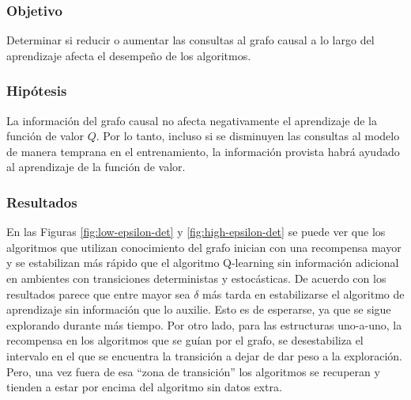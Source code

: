 \subsubsection{Objetivo}

Determinar si reducir o aumentar las consultas al grafo causal a lo largo del aprendizaje afecta el desempeño
de los algoritmos.

\subsubsection{Hipótesis}

La información del grafo causal no afecta negativamente 
el aprendizaje de la función de valor $Q$. Por lo tanto, incluso si se disminuyen las consultas al modelo de manera temprana en el entrenamiento, la información provista habrá
ayudado al aprendizaje de la función de valor.

\subsubsection{Resultados}

En las Figuras \ref{fig:low-epsilon-det} y \ref{fig:high-epsilon-det} se puede ver que los algoritmos que utilizan conocimiento del grafo inician con una recompensa mayor y se estabilizan más rápido que el algoritmo Q-learning
sin información adicional en ambientes con transiciones deterministas y estocásticas.
De acuerdo con los resultados parece que 
entre mayor sea $\delta$ más tarda en estabilizarse
el algoritmo de aprendizaje sin información que lo auxilie. Esto es de esperarse, ya que se sigue explorando durante más tiempo. 
Por otro lado, para las estructuras uno-a-uno, la recompensa en los algoritmos que se guían por el grafo, se desestabiliza el intervalo en el que se encuentra la transición a dejar de dar peso a
la exploración. Pero, una vez fuera de esa ``zona de transición'' los
algoritmos se recuperan y tienden a estar por encima del algoritmo sin datos 
extra.


